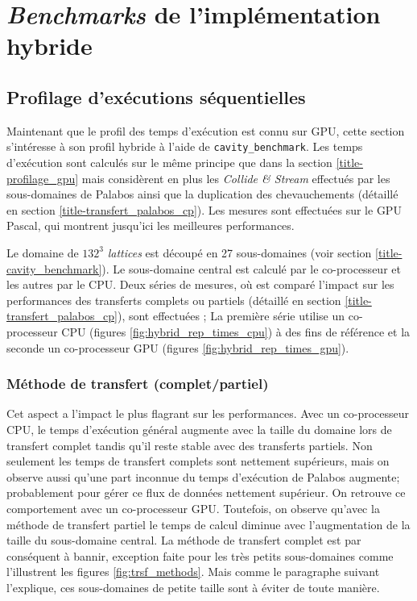 \section{\textit{Benchmarks} de l'implémentation hybride}

\subsection{Profilage d'exécutions séquentielles}
Maintenant que le profil des temps d'exécution est connu sur \acs{GPU}, cette section s'intéresse à son profil hybride à l'aide de \texttt{cavity\_benchmark}. Les temps d'exécution sont calculés sur le même principe que dans la section \ref{title-profilage_gpu} mais considèrent en plus les \textit{Collide \& Stream} effectués par les sous-domaines de Palabos ainsi que la duplication des chevauchements (détaillé en section \ref{title-transfert_palabos_cp}). Les mesures sont effectuées sur le \acs{GPU} Pascal, qui montrent jusqu'ici les meilleures performances. 

Le domaine de $132^3$ \textit{lattices} est découpé en 27 sous-domaines (voir section \ref{title-cavity_benchmark}). Le sous-domaine central est calculé par le co-processeur et les autres par le \acs{CPU}. Deux séries de mesures, où est comparé l'impact sur les performances des transferts complets ou partiels (détaillé en section \ref{title-transfert_palabos_cp}),  sont effectuées ; La première série utilise un co-processeur \acs{CPU} (figures \ref{fig:hybrid_rep_times_cpu}) à des fins de référence et la seconde un co-processeur \acs{GPU} (figures \ref{fig:hybrid_rep_times_gpu}).

\subsubsection{Méthode de transfert (complet/partiel)}
Cet  aspect a l'impact le plus flagrant sur les performances. Avec un co-processeur \acs{CPU}, le temps d'exécution général augmente avec la taille du domaine lors de transfert complet tandis qu'il reste stable avec des transferts partiels. Non seulement les temps de transfert complets sont nettement supérieurs, mais on observe aussi qu'une part inconnue du temps d'exécution de Palabos augmente; probablement pour gérer ce flux de données nettement supérieur. On retrouve ce comportement avec un co-processeur \acs{GPU}. Toutefois, on observe qu’avec la méthode de transfert partiel le temps de calcul diminue avec l’augmentation de la taille du sous-domaine central. La méthode de transfert complet est par conséquent à bannir, exception faite pour les très petits sous-domaines comme l'illustrent les figures \ref{fig:trsf_methods}. Mais comme le paragraphe suivant l’explique, ces sous-domaines de petite taille sont à éviter de toute manière.

